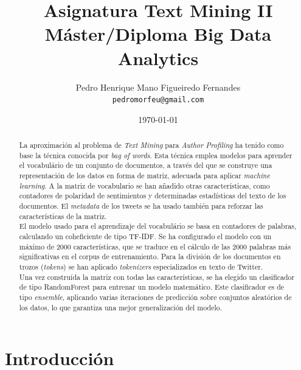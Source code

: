 \documentclass[11pt,a4paper]{article}
\title{Asignatura Text Mining II\\
M\'aster/Diploma Big Data Analytics}
\author{Pedro Henrique Mano Figueiredo Fernandes \\
  {\tt pedromorfeu@gmail.com} \\}
\date{\today}
\begin{document}
\maketitle
\begin{abstract}

  \indent La aproximaci\'on al problema de {\em Text Mining} para {\em Author Profiling} ha tenido como base la t\'ecnica conocida por {\em bag of words}. Esta t\'ecnica emplea modelos para aprender el vocabul\'ario de un conjunto de documentos, a trav\'es del que se construye una representaci\'on de los datos en forma de matriz, adecuada para aplicar {\em machine learning}. A la matriz de vocabulario se han a\~nadido otras caracter\'isticas, como contadores de polaridad de sentimientos y determinadas estad\'isticas del texto de los documentos. El {\em metadata} de los tweets se ha usado tambi\'en para reforzar las caracter\'isticas de la matriz.\\
  \indent El modelo usado para el aprendizaje del vocabul\'ario se basa en contadores de palabras, calculando un coheficiente de tipo TF-IDF. Se ha configurado el modelo con un m\'aximo de 2000 caracter\'isticas, que se traduce en el c\'alculo de las 2000 palabras más significativas en el corpus de entrenamiento. Para la divisi\'on de los documentos en trozos ({\em tokens}) se han aplicado {\em tokenizers} especializados en texto de Twitter.\\
  \indent Una vez constru\'ida la matriz con todas las caracter\'isticas, se ha elegido un clasificador de tipo RandomForest para entrenar un modelo matem\'atico. Este clasificador es de tipo {\em ensemble}, aplicando varias iteraciones de predicci\'on sobre conjuntos aleat\'orios de los datos, lo que garantiza una mejor generalizaci\'on del modelo.

\end{abstract}


\section{Introducci\'on}
\end{document}
